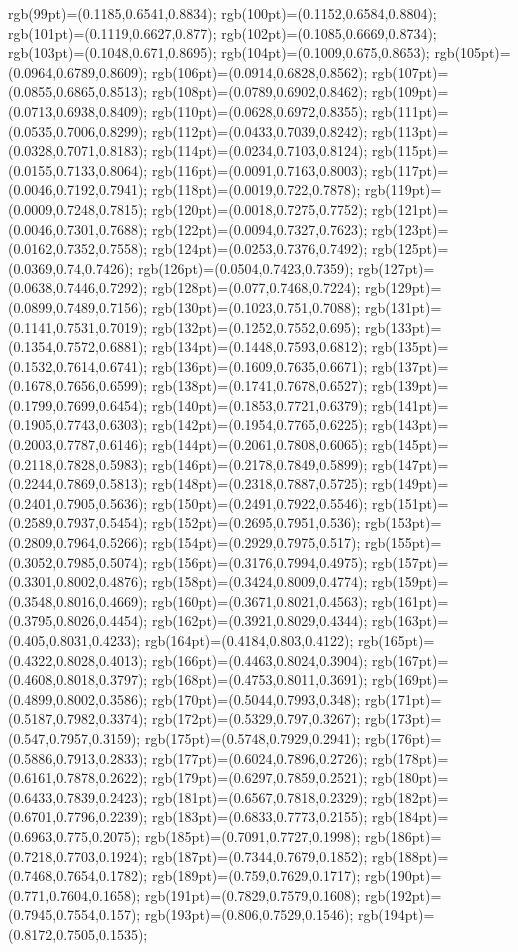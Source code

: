 {rgb(99pt)=(0.1185,0.6541,0.8834); rgb(100pt)=(0.1152,0.6584,0.8804); rgb(101pt)=(0.1119,0.6627,0.877); rgb(102pt)=(0.1085,0.6669,0.8734); rgb(103pt)=(0.1048,0.671,0.8695); rgb(104pt)=(0.1009,0.675,0.8653); rgb(105pt)=(0.0964,0.6789,0.8609); rgb(106pt)=(0.0914,0.6828,0.8562); rgb(107pt)=(0.0855,0.6865,0.8513); rgb(108pt)=(0.0789,0.6902,0.8462); rgb(109pt)=(0.0713,0.6938,0.8409); rgb(110pt)=(0.0628,0.6972,0.8355); rgb(111pt)=(0.0535,0.7006,0.8299); rgb(112pt)=(0.0433,0.7039,0.8242); rgb(113pt)=(0.0328,0.7071,0.8183); rgb(114pt)=(0.0234,0.7103,0.8124); rgb(115pt)=(0.0155,0.7133,0.8064); rgb(116pt)=(0.0091,0.7163,0.8003); rgb(117pt)=(0.0046,0.7192,0.7941); rgb(118pt)=(0.0019,0.722,0.7878); rgb(119pt)=(0.0009,0.7248,0.7815); rgb(120pt)=(0.0018,0.7275,0.7752); rgb(121pt)=(0.0046,0.7301,0.7688); rgb(122pt)=(0.0094,0.7327,0.7623); rgb(123pt)=(0.0162,0.7352,0.7558); rgb(124pt)=(0.0253,0.7376,0.7492); rgb(125pt)=(0.0369,0.74,0.7426); rgb(126pt)=(0.0504,0.7423,0.7359); rgb(127pt)=(0.0638,0.7446,0.7292); rgb(128pt)=(0.077,0.7468,0.7224); rgb(129pt)=(0.0899,0.7489,0.7156); rgb(130pt)=(0.1023,0.751,0.7088); rgb(131pt)=(0.1141,0.7531,0.7019); rgb(132pt)=(0.1252,0.7552,0.695); rgb(133pt)=(0.1354,0.7572,0.6881); rgb(134pt)=(0.1448,0.7593,0.6812); rgb(135pt)=(0.1532,0.7614,0.6741); rgb(136pt)=(0.1609,0.7635,0.6671); rgb(137pt)=(0.1678,0.7656,0.6599); rgb(138pt)=(0.1741,0.7678,0.6527); rgb(139pt)=(0.1799,0.7699,0.6454); rgb(140pt)=(0.1853,0.7721,0.6379); rgb(141pt)=(0.1905,0.7743,0.6303); rgb(142pt)=(0.1954,0.7765,0.6225); rgb(143pt)=(0.2003,0.7787,0.6146); rgb(144pt)=(0.2061,0.7808,0.6065); rgb(145pt)=(0.2118,0.7828,0.5983); rgb(146pt)=(0.2178,0.7849,0.5899); rgb(147pt)=(0.2244,0.7869,0.5813); rgb(148pt)=(0.2318,0.7887,0.5725); rgb(149pt)=(0.2401,0.7905,0.5636); rgb(150pt)=(0.2491,0.7922,0.5546); rgb(151pt)=(0.2589,0.7937,0.5454); rgb(152pt)=(0.2695,0.7951,0.536); rgb(153pt)=(0.2809,0.7964,0.5266); rgb(154pt)=(0.2929,0.7975,0.517); rgb(155pt)=(0.3052,0.7985,0.5074); rgb(156pt)=(0.3176,0.7994,0.4975); rgb(157pt)=(0.3301,0.8002,0.4876); rgb(158pt)=(0.3424,0.8009,0.4774); rgb(159pt)=(0.3548,0.8016,0.4669); rgb(160pt)=(0.3671,0.8021,0.4563); rgb(161pt)=(0.3795,0.8026,0.4454); rgb(162pt)=(0.3921,0.8029,0.4344); rgb(163pt)=(0.405,0.8031,0.4233); rgb(164pt)=(0.4184,0.803,0.4122); rgb(165pt)=(0.4322,0.8028,0.4013); rgb(166pt)=(0.4463,0.8024,0.3904); rgb(167pt)=(0.4608,0.8018,0.3797); rgb(168pt)=(0.4753,0.8011,0.3691); rgb(169pt)=(0.4899,0.8002,0.3586); rgb(170pt)=(0.5044,0.7993,0.348); rgb(171pt)=(0.5187,0.7982,0.3374); rgb(172pt)=(0.5329,0.797,0.3267); rgb(173pt)=(0.547,0.7957,0.3159); rgb(175pt)=(0.5748,0.7929,0.2941); rgb(176pt)=(0.5886,0.7913,0.2833); rgb(177pt)=(0.6024,0.7896,0.2726); rgb(178pt)=(0.6161,0.7878,0.2622); rgb(179pt)=(0.6297,0.7859,0.2521); rgb(180pt)=(0.6433,0.7839,0.2423); rgb(181pt)=(0.6567,0.7818,0.2329); rgb(182pt)=(0.6701,0.7796,0.2239); rgb(183pt)=(0.6833,0.7773,0.2155); rgb(184pt)=(0.6963,0.775,0.2075); rgb(185pt)=(0.7091,0.7727,0.1998); rgb(186pt)=(0.7218,0.7703,0.1924); rgb(187pt)=(0.7344,0.7679,0.1852); rgb(188pt)=(0.7468,0.7654,0.1782); rgb(189pt)=(0.759,0.7629,0.1717); rgb(190pt)=(0.771,0.7604,0.1658); rgb(191pt)=(0.7829,0.7579,0.1608); rgb(192pt)=(0.7945,0.7554,0.157); rgb(193pt)=(0.806,0.7529,0.1546); rgb(194pt)=(0.8172,0.7505,0.1535); }
